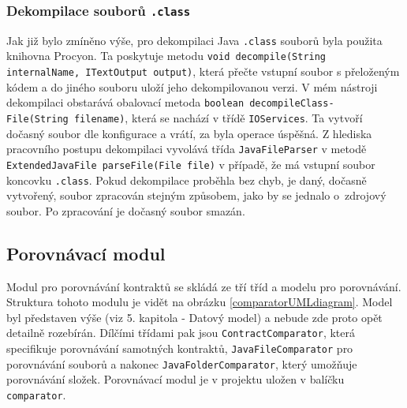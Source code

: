 		\subsubsection{Dekompilace souborů \texttt{.class}}
			Jak již bylo zmíněno výše, pro dekompilaci Java \texttt{.class} souborů byla použita knihovna Procyon. Ta poskytuje metodu \texttt{void decompile(String internalName, ITextOutput output)}, která přečte vstupní soubor s přeloženým kódem a do jiného souboru uloží jeho dekompilovanou verzi. V mém nástroji dekompilaci obstarává obalovací metoda \texttt{boolean decompileClass-\\File(String filename)}, která se nachází v třídě \texttt{IOServices}. Ta vytvoří dočasný soubor dle konfigurace a vrátí, za byla operace úspěšná. Z hlediska pracovního postupu dekompilaci vyvolává třída \texttt{JavaFileParser} v metodě \texttt{ExtendedJavaFile parseFile(File file)} v případě, že má vstupní soubor koncovku \texttt{.class}. Pokud dekompilace proběhla bez chyb, je daný, dočasně vytvořený, soubor zpracován stejným způsobem, jako by se jednalo o~zdrojový soubor. Po zpracování je dočasný soubor smazán.
					

	    


		

	    \subsection{Porovnávací modul}
	    	Modul pro porovnávání kontraktů se skládá ze tří tříd a modelu pro porovnávání. Struktura tohoto modulu je vidět na obrázku \ref{comparatorUMLdiagram}. Model byl představen výše (viz 5. kapitola - Datový model) a nebude zde proto opět detailně rozebírán. Dílčími třídami pak jsou \texttt{ContractComparator}, která specifikuje porovnávání samotných kontraktů, \texttt{JavaFileComparator} pro porovnávání souborů a nakonec \texttt{JavaFolderComparator}, který umožňuje porovnávání složek. Porovnávací modul je v projektu uložen v balíčku \texttt{comparator}.\\
	    	
